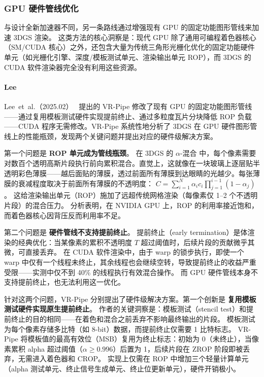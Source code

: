 \subsubsection{GPU 硬件管线优化}

与设计全新加速器不同，另一条路线通过增强现有 GPU 的固定功能图形管线来加速 3DGS 渲染。
这类方法的核心洞察是：现代 GPU 除了通用可编程着色器核心（SM/CUDA 核心）之外，还包含大量为传统三角形光栅化优化的固定功能硬件单元（如光栅化引擎、深度/模板测试单元、渲染输出单元 ROP），而 3DGS 的 CUDA 软件渲染器完全没有利用这些资源。

\paragraph{Lee}
Lee~et~al.（2025.02）~\cite{2502_17078} 提出的 VR-Pipe 修改了现有 GPU 的固定功能图形管线——通过复用模板测试硬件实现提前终止、通过多粒度瓦片分块降低 ROP 负载——CUDA 程序无需修改。VR-Pipe 系统性地分析了 3DGS 在 GPU 硬件图形管线上的性能瓶颈，发现两个关键问题并提出对应的硬件级解决方案。

第一个问题是 \textbf{ROP 单元成为管线瓶颈}。
在 3DGS 的 $\alpha$-混合 中，每个像素需要对数百个透明高斯片段执行前向累积混合。直觉上，这就像在一块玻璃上逐层贴半透明彩色薄膜——越后面贴的薄膜，透过前面所有薄膜到达眼睛的光越少。每张薄膜的衰减程度取决于前面所有薄膜的不透明度：
$C = \sum_{i=1}^{N} \alpha_i c_i \prod_{j=1}^{i-1}(1-\alpha_j)$。
这给渲染输出单元（ROP）施加了远超传统网格渲染（每像素仅 1--2 个不透明片段）的混合压力。
分析表明，在 NVIDIA GPU 上，ROP 的利用率接近饱和，而着色器核心因背压反而利用率不足。

第二个问题是 \textbf{硬件管线不支持提前终止}。
提前终止（early termination）是体渲染的经典优化：当某像素的累积不透明度 $T$ 超过阈值时，后续片段的贡献微乎其微，可直接丢弃。
在 CUDA 软件渲染中，由于 warp 的锁步执行，即使一个 warp 中仅有一个线程未终止，其余线程也会继续空转，导致提前终止的收益严重受限——实测中仅不到 40\% 的线程执行有效混合操作。
而 GPU 硬件管线本身不支持提前终止，也无法利用这一优化。

针对这两个问题，VR-Pipe 分别提出了硬件级解决方案。第一个创新是 \textbf{复用模板测试硬件实现原生提前终止}。
作者的关键洞察是：模板测试（stencil test）和提前终止的目的相同——在着色和混合之前丢弃不影响最终输出的片段。
模板测试为每个像素存储多比特（如 8-bit）数据，而提前终止仅需要 1 比特标志。
VR-Pipe 将模板值的最高有效位（MSB）复用为终止标志：初始为 0（未终止），当像素累积 alpha 超过阈值（$\alpha \geq 0.996$）后置为 1，后续片段在 ZROP 阶段即被丢弃，无需进入着色器和 CROP。
实现上仅需在 ROP 中增加三个轻量计算单元（alpha 测试单元、终止信号生成单元、终止位更新单元），硬件开销极小。

